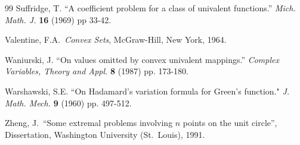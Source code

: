 \documentclass[final]{siamltex}
\begin{document}
\begin{thebibliography}{99}
 Suffridge, T.  ``A coefficient problem for a class
of univalent functions.''  {\em Mich. Math. J.}  {\bf 16} (1969) pp
33-42.

 Valentine, F.A.\ {\em Convex Sets}, McGraw-Hill, New
York, 1964.

 Waniurski, J.  ``On values omitted by convex
univalent mappings.''  {\em Complex Variables, Theory and Appl.}  
{\bf 8} (1987) pp. 173-180.

 Warshawski, S.E. ``On Hadamard's variation formula for 
Green's function."  {\em J. Math. Mech.} {\bf 9} (1960) pp. 497-512.

 Zheng, J.\ ``Some extremal problems involving $n$ points
on the unit circle'', Dissertation, Washington University (St.\
Louis), 1991.


\end{thebibliography}
\end{document}
